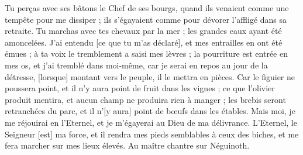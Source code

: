 \begin{multicols}{2}
Tu perças avec ses bâtons le Chef de ses bourgs, quand ils venaient comme une tempête pour me dissiper ; ils s'égayaient comme pour dévorer l'affligé dans sa retraite.
Tu marchas avec tes chevaux par la mer ; les grandes eaux ayant été amoncelées.
J'ai entendu [ce que tu m'as déclaré], et mes entrailles en ont été émues ; à ta voix le tremblement a saisi mes lèvres ; la pourriture est entrée en mes os, et j'ai tremblé dans moi-même, car je serai en repos au jour de la détresse, [lorsque] montant vers le peuple, il le mettra en pièces.
Car le figuier ne poussera point, et il n'y aura point de fruit dans les vignes ; ce que l'olivier produit mentira, et aucun champ ne produira rien à manger ; les brebis seront retranchées du parc, et il n'[y aura] point de bœufs dans les étables.
Mais moi, je me réjouirai en l'Eternel, et je m'égayerai au Dieu de ma délivrance.
L'Eternel, le Seigneur [est] ma force, et il rendra mes pieds semblables à ceux des biches, et me fera marcher sur mes lieux élevés. Au maître chantre sur Néguinoth.
\PPE{}
\end{multicols}
